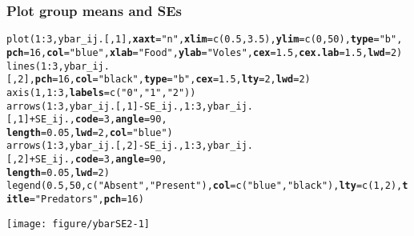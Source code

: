 \documentclass[color=usenames,dvipsnames]{beamer}\usepackage[]{graphicx}\usepackage[]{color}
\makeatletter
\newcommand{\hlnum}[1]{\textcolor[rgb]{0.69,0.494,0}{#1}}%
\newcommand{\hlstr}[1]{\textcolor[rgb]{0.749,0.012,0.012}{#1}}%
\newcommand{\hlopt}[1]{\textcolor[rgb]{0,0,0}{#1}}%
\newcommand{\hlstd}[1]{\textcolor[rgb]{0,0,0}{#1}}%
\newcommand{\hlkwc}[1]{\textcolor[rgb]{0,0,0}{\textbf{#1}}}%
\newcommand{\hlkwd}[1]{\textcolor[rgb]{0.004,0.004,0.506}{#1}}%
\newenvironment{kframe}{%
 \def\at@end@of@kframe{}%
 \ifinner\ifhmode%
  \def\at@end@of@kframe{\end{minipage}}%
  \begin{minipage}{\columnwidth}%
 \fi\fi%
 \def\FrameCommand##1{\hskip\@totalleftmargin \hskip-\fboxsep
 \colorbox{shadecolor}{##1}\hskip-\fboxsep
     \hskip-\linewidth \hskip-\@totalleftmargin \hskip\columnwidth}%
 \MakeFramed {\advance\hsize-\width
   \@totalleftmargin\z@ \linewidth\hsize
   \@setminipage}}%
 {\par\unskip\endMakeFramed%
 \at@end@of@kframe}
\newenvironment{knitrout}{}{} %
\makeatother
\begin{document}
\begin{frame}[fragile]
  \frametitle{Plot group means and SEs}
  \tiny
\begin{knitrout}\tiny
{}\color{fgcolor}\begin{kframe}
\begin{alltt}
\hlkwd{plot}\hlstd{(}\hlnum{1}\hlopt{:}\hlnum{3}\hlstd{, ybar_ij.[,}\hlnum{1}\hlstd{],} \hlkwc{xaxt}\hlstd{=}\hlstr{"n"}\hlstd{,} \hlkwc{xlim}\hlstd{=}\hlkwd{c}\hlstd{(}\hlnum{0.5}\hlstd{,} \hlnum{3.5}\hlstd{),} \hlkwc{ylim}\hlstd{=}\hlkwd{c}\hlstd{(}\hlnum{0}\hlstd{,} \hlnum{50}\hlstd{),} \hlkwc{type}\hlstd{=}\hlstr{"b"}\hlstd{,}
     \hlkwc{pch}\hlstd{=}\hlnum{16}\hlstd{,} \hlkwc{col}\hlstd{=}\hlstr{"blue"}\hlstd{,} \hlkwc{xlab}\hlstd{=}\hlstr{"Food"}\hlstd{,} \hlkwc{ylab}\hlstd{=}\hlstr{"Voles"}\hlstd{,} \hlkwc{cex}\hlstd{=}\hlnum{1.5}\hlstd{,} \hlkwc{cex.lab}\hlstd{=}\hlnum{1.5}\hlstd{,} \hlkwc{lwd}\hlstd{=}\hlnum{2}\hlstd{)}
\hlkwd{lines}\hlstd{(}\hlnum{1}\hlopt{:}\hlnum{3}\hlstd{, ybar_ij.[,}\hlnum{2}\hlstd{],} \hlkwc{pch}\hlstd{=}\hlnum{16}\hlstd{,} \hlkwc{col}\hlstd{=}\hlstr{"black"}\hlstd{,} \hlkwc{type}\hlstd{=}\hlstr{"b"}\hlstd{,} \hlkwc{cex}\hlstd{=}\hlnum{1.5}\hlstd{,} \hlkwc{lty}\hlstd{=}\hlnum{2}\hlstd{,} \hlkwc{lwd}\hlstd{=}\hlnum{2}\hlstd{)}
\hlkwd{axis}\hlstd{(}\hlnum{1}\hlstd{,} \hlnum{1}\hlopt{:}\hlnum{3}\hlstd{,} \hlkwc{labels}\hlstd{=}\hlkwd{c}\hlstd{(}\hlstr{"0"}\hlstd{,} \hlstr{"1"}\hlstd{,} \hlstr{"2"}\hlstd{))}
\hlkwd{arrows}\hlstd{(}\hlnum{1}\hlopt{:}\hlnum{3}\hlstd{, ybar_ij.[,}\hlnum{1}\hlstd{]}\hlopt{-}\hlstd{SE_ij.,} \hlnum{1}\hlopt{:}\hlnum{3}\hlstd{, ybar_ij.[,}\hlnum{1}\hlstd{]}\hlopt{+}\hlstd{SE_ij.,} \hlkwc{code}\hlstd{=}\hlnum{3}\hlstd{,} \hlkwc{angle}\hlstd{=}\hlnum{90}\hlstd{,}
       \hlkwc{length}\hlstd{=}\hlnum{0.05}\hlstd{,} \hlkwc{lwd}\hlstd{=}\hlnum{2}\hlstd{,} \hlkwc{col}\hlstd{=}\hlstr{"blue"}\hlstd{)}
\hlkwd{arrows}\hlstd{(}\hlnum{1}\hlopt{:}\hlnum{3}\hlstd{, ybar_ij.[,}\hlnum{2}\hlstd{]}\hlopt{-}\hlstd{SE_ij.,} \hlnum{1}\hlopt{:}\hlnum{3}\hlstd{, ybar_ij.[,}\hlnum{2}\hlstd{]}\hlopt{+}\hlstd{SE_ij.,} \hlkwc{code}\hlstd{=}\hlnum{3}\hlstd{,} \hlkwc{angle}\hlstd{=}\hlnum{90}\hlstd{,}
       \hlkwc{length}\hlstd{=}\hlnum{0.05}\hlstd{,} \hlkwc{lwd}\hlstd{=}\hlnum{2}\hlstd{)}
\hlkwd{legend}\hlstd{(}\hlnum{0.5}\hlstd{,} \hlnum{50}\hlstd{,} \hlkwd{c}\hlstd{(}\hlstr{"Absent"}\hlstd{,} \hlstr{"Present"}\hlstd{),} \hlkwc{col}\hlstd{=}\hlkwd{c}\hlstd{(}\hlstr{"blue"}\hlstd{,} \hlstr{"black"}\hlstd{),} \hlkwc{lty}\hlstd{=}\hlkwd{c}\hlstd{(}\hlnum{1}\hlstd{,}\hlnum{2}\hlstd{),} \hlkwc{title}\hlstd{=}\hlstr{"Predators"}\hlstd{,} \hlkwc{pch}\hlstd{=}\hlnum{16}\hlstd{)}
\end{alltt}
\end{kframe}
\end{knitrout}
\begin{center}
  \texttt{[image: figure/ybarSE2-1]}
\end{center}
\end{frame}
\end{document}
